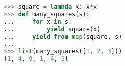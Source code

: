 \begin{lstlisting}[language=Python]
>>> square = lambda x: x*x
>>> def many_squares(s):
...     for x in s:
...         yield square(x)
...     yield from map(square, s)
...
>>> list(many_squares([1, 2, 3]))
[1, 4, 9, 1, 4, 9]
\end{lstlisting}
